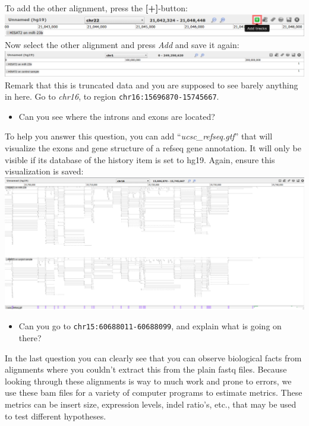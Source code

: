 To add the other alignment, press the \textbf{[+]}-button:\\
\includegraphics[width=\textwidth]{figures/alignment_06.png}\\
Now select the other alignment and press \textit{Add} and save it again:\\
\includegraphics[width=\textwidth]{figures/alignment_07.png}\\
Remark that this is truncated data and you are supposed to see barely anything in here. Go to \textit{chr16}, to region \verb|chr16:15696870-15745667|.
\begin{itemize}
	\item Can you see where the introns and exons are located?
\end{itemize}
To help you answer this question, you can add ``\textit{ucsc\_refseq.gtf}'' that will visualize the exons and gene structure of a refseq gene annotation. It will only be visible if its database of the history item is set to hg19. Again, ensure this visualization is saved:\\
\includegraphics[width=\textwidth]{figures/alignment_08.png}\\
\begin{itemize}
	\item Can you go to \verb|chr15:60688011-60688099|, and explain what is going on there?
\end{itemize}
In the last question you can clearly see that you can observe biological facts from alignments where you couldn't extract this from the plain fastq files. Because looking through these alignments is way to much work and prone to errors, we use these bam files for a variety of computer programs to estimate metrics. These metrics can be insert size, expression levels, indel ratio's, etc., that may be used to test different hypotheses.


